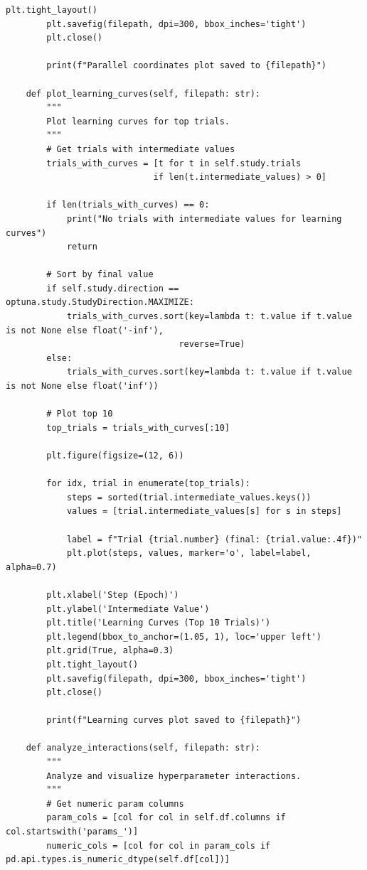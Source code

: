 \begin{lstlisting}[style=python, caption=Comprehensive HPO analysis and visualization]
        plt.tight_layout()
        plt.savefig(filepath, dpi=300, bbox_inches='tight')
        plt.close()

        print(f"Parallel coordinates plot saved to {filepath}")

    def plot_learning_curves(self, filepath: str):
        """
        Plot learning curves for top trials.
        """
        # Get trials with intermediate values
        trials_with_curves = [t for t in self.study.trials
                             if len(t.intermediate_values) > 0]

        if len(trials_with_curves) == 0:
            print("No trials with intermediate values for learning curves")
            return

        # Sort by final value
        if self.study.direction == optuna.study.StudyDirection.MAXIMIZE:
            trials_with_curves.sort(key=lambda t: t.value if t.value is not None else float('-inf'),
                                  reverse=True)
        else:
            trials_with_curves.sort(key=lambda t: t.value if t.value is not None else float('inf'))

        # Plot top 10
        top_trials = trials_with_curves[:10]

        plt.figure(figsize=(12, 6))

        for idx, trial in enumerate(top_trials):
            steps = sorted(trial.intermediate_values.keys())
            values = [trial.intermediate_values[s] for s in steps]

            label = f"Trial {trial.number} (final: {trial.value:.4f})"
            plt.plot(steps, values, marker='o', label=label, alpha=0.7)

        plt.xlabel('Step (Epoch)')
        plt.ylabel('Intermediate Value')
        plt.title('Learning Curves (Top 10 Trials)')
        plt.legend(bbox_to_anchor=(1.05, 1), loc='upper left')
        plt.grid(True, alpha=0.3)
        plt.tight_layout()
        plt.savefig(filepath, dpi=300, bbox_inches='tight')
        plt.close()

        print(f"Learning curves plot saved to {filepath}")

    def analyze_interactions(self, filepath: str):
        """
        Analyze and visualize hyperparameter interactions.
        """
        # Get numeric param columns
        param_cols = [col for col in self.df.columns if col.startswith('params_')]
        numeric_cols = [col for col in param_cols if pd.api.types.is_numeric_dtype(self.df[col])]


\end{lstlisting}
